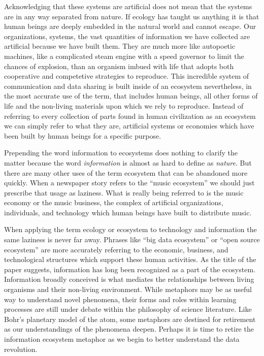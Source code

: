 Acknowledging that these systems are artificial does not mean that the systems are in any way separated from nature. If ecology has taught us anything it is that human beings are deeply embedded in the natural world and cannot escape. Our organizations, systems, the vast quantities of information we have collected are artificial because we have built them. They are much more like autopoetic machines, like a complicated steam engine with a speed governor to limit the chances of explosion, than an organism imbued with life that adopts both cooperative and competetive strategies to reproduce. This incredible system of communication and data sharing is built inside of an ecosystem nevertheless, in the most accurate use of the term, that includes human beings, all other forms of life and the non-living materials upon which we rely to reproduce. Instead of referring to every collection of parts found in human civilization as an ecosystem we can simply refer to what they are, artificial systems or economies which have been built by human beings for a specific purpose.

Prepending the word information to ecosystems does nothing to clarify the matter because the word \textit{information} is almost as hard to define as \textit{nature}. But there are many other uses of the term ecosystem that can be abandoned more quickly. When a newspaper story refers to the “music ecosystem” we should just prescribe that usage as laziness. What is really being referred to is the music economy or the music business, the complex of artificial organizations, individuals, and technology which human beings have built to distribute music.

When applying the term ecology or ecosystem to technology and information the same laziness is never far away. Phrases like “big data ecosystem” or “open source ecosystem” are more accurately referring to the economic, business, and technological structures which support these human activities. As the title of the paper suggests, information has long been recognized as a part of the ecosystem. Information broadly conceived is what mediates the relationships between living organisms and their non-living environment. While metaphors may be as useful way to understand novel phenomena, their forms and roles within learning processes are still under debate within the philosophy of science literature. Like Bohr's planetary model of the atom, some metaphors are destined for retirement as our understandings of the phenomena deepen. Perhaps it is time to retire the information ecosystem metaphor as we begin to better understand the data revolution.